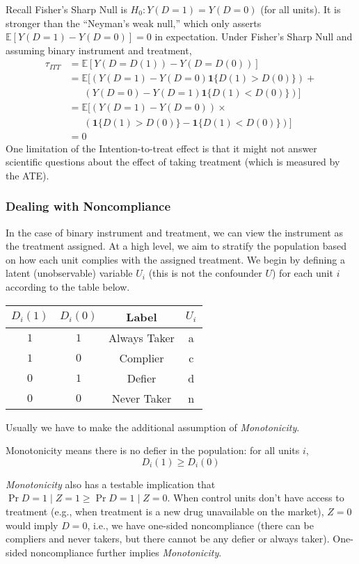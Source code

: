 Recall Fisher's Sharp Null is \(H_0: Y(D = 1) = Y(D = 0)\) (for all units). It is stronger than the ``Neyman's weak null,'' which only asserts $\mathbb{E}[Y(D = 1) - Y(D = 0)] = 0$ in expectation. Under Fisher's Sharp Null and assuming binary instrument and treatment,
\begin{align*}
    \tau_{ITT} &= \mathbb{E}[Y(D = D(1)) - Y(D = D(0))] \\
    &= \mathbb{E}[(Y(D = 1) - Y(D = 0) \mathbf{1}\{D(1) > D(0)\}) + \\
    &~~~~~~~(Y(D = 0) - Y(D = 1) \mathbf{1}\{D(1) < D(0)\})] \\ 
    &= \mathbb{E}[(Y(D = 1) - Y(D = 0)) \times \\
    &~~~~~~~(\mathbf{1}\{D(1) > D(0)\} - \mathbf{1}\{D(1) < D(0)\})] \\
    &= 0
\end{align*}
One limitation of the Intention-to-treat effect is that it might not answer scientific questions about the effect of taking treatment (which is measured by the ATE). 

\subsubsection{Dealing with Noncompliance}
In the case of binary instrument and treatment, we can view the instrument as the treatment assigned. At a high level, we aim to stratify the population based on how each unit complies with the assigned treatment. We begin by defining a latent (unobservable) variable \(U_i\) (this is not the confounder \(U\)) for each unit \(i\) according to the table below. 

\begin{table}[h]
    \centering
    \begin{tabular}{|c|c|c|c|}
        \hline
        \(D_i(1)\) & \(D_i(0)\) & Label & \(U_i\) \\
        \hline
        \( 1 \) & \( 1 \) & Always Taker & a \\
        \( 1 \) & \( 0 \) & Complier & c \\
        \( 0 \) & \( 1 \) & Defier & d \\
        \( 0 \) & \( 0 \) & Never Taker & n \\
        \hline
    \end{tabular}
\end{table}

Usually we have to make the additional assumption of \textit{Monotonicity}.
\begin{assumption}
    Monotonicity means there is no defier in the population: for all units \(i\), \[D_i(1) \geq D_i(0)\]
\end{assumption}
\textit{Monotonicity} also has a testable implication that \(\Pr{D = 1 \mid Z = 1} \geq \Pr{D = 1 \mid Z = 0}\). When control units don't have access to treatment (e.g., when treatment is a new drug unavailable on the market), \(Z = 0\) would imply \(D = 0\), i.e., we have one-sided noncompliance (there can be compliers and never takers, but there cannot be any defier or always taker). One-sided noncompliance further implies \textit{Monotonicity}.


